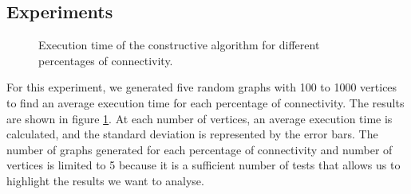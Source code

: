
\subsection{Experiments}

\begin{figure}[H]
    \centering
    \caption{Execution time of the constructive algorithm for different percentages of connectivity.}
    \label{fig:constructive_time}
\end{figure}

For this experiment, we generated five random graphs with 100 to 1000 vertices to find an average execution time for each percentage of connectivity. The results are shown in figure \ref{fig:constructive_time}. At each number of vertices, an average execution time is calculated, and the standard deviation is represented by the error bars. The number of graphs generated for each percentage of connectivity and number of vertices is limited to 5 because it is a sufficient number of tests that allows us to highlight the results we want to analyse.